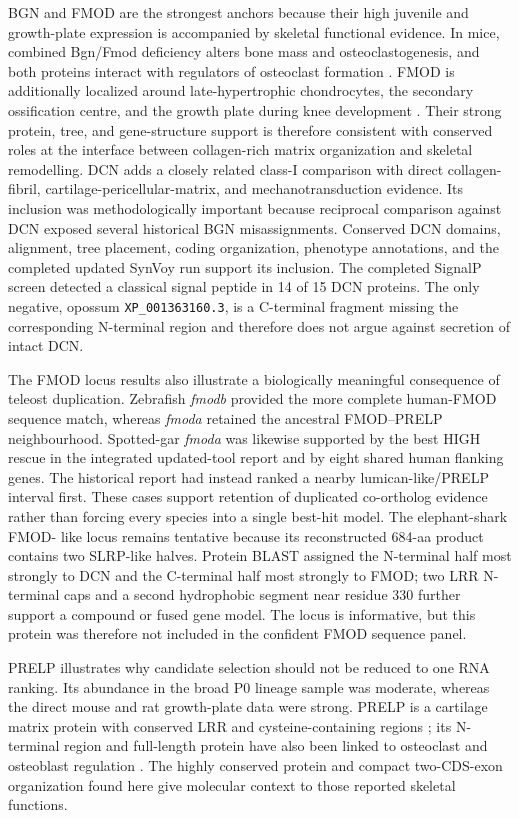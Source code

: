 BGN and FMOD are the strongest anchors because their high juvenile and
growth-plate expression is accompanied by skeletal functional evidence. In mice,
combined Bgn/Fmod deficiency alters bone mass and osteoclastogenesis, and both
proteins interact with regulators of osteoclast formation \citep{Kram2017}.
FMOD is additionally localized around late-hypertrophic chondrocytes, the
secondary ossification centre, and the growth plate during knee development
\citep{Saamanen2001}. Their strong protein, tree, and gene-structure support is
therefore consistent with conserved roles at the interface between collagen-rich
matrix organization and skeletal remodelling. DCN adds a closely related class-I
comparison with direct collagen-fibril, cartilage-pericellular-matrix, and
mechanotransduction evidence. Its inclusion was methodologically important
because reciprocal comparison against DCN exposed several historical BGN
misassignments. Conserved DCN domains, alignment, tree placement, coding
organization, phenotype annotations, and the completed updated SynVoy run
support its inclusion. The completed SignalP screen detected a classical signal
peptide in 14 of 15 DCN proteins. The only negative, opossum
\texttt{XP\_001363160.3}, is a C-terminal fragment missing the corresponding
N-terminal region and therefore does not argue against secretion of intact DCN.

The FMOD locus results also illustrate a biologically meaningful consequence
of teleost duplication. Zebrafish \textit{fmodb} provided the more complete
human-FMOD sequence match, whereas \textit{fmoda} retained the ancestral
FMOD--PRELP neighbourhood. Spotted-gar \textit{fmoda} was likewise supported by
the best HIGH rescue in the integrated updated-tool report and by eight shared
human flanking genes. The historical report had instead ranked a nearby
lumican-like/PRELP interval first.
These cases support retention of duplicated co-ortholog evidence rather than
forcing every species into a single best-hit model. The elephant-shark FMOD-
like locus remains tentative because its reconstructed 684-aa product contains
two SLRP-like halves. Protein BLAST assigned the N-terminal half most strongly
to DCN and the C-terminal half most strongly to FMOD; two LRR N-terminal caps
and a second hydrophobic segment near residue 330 further support a compound or
fused gene model. The locus is informative, but this protein was therefore not
included in the confident FMOD sequence panel.

PRELP illustrates why candidate selection should not be reduced to one RNA
ranking. Its abundance in the broad P0 lineage sample was moderate, whereas the
direct mouse and rat growth-plate data were strong. PRELP is a cartilage matrix
protein with conserved LRR and cysteine-containing regions
\citep{Grover1996,Grover2002}; its N-terminal region and full-length protein have
also been linked to osteoclast and osteoblast regulation
\citep{Rucci2009,Li2016PRELP}. The highly conserved protein and compact
two-CDS-exon organization found here give molecular context to those reported
skeletal functions.


